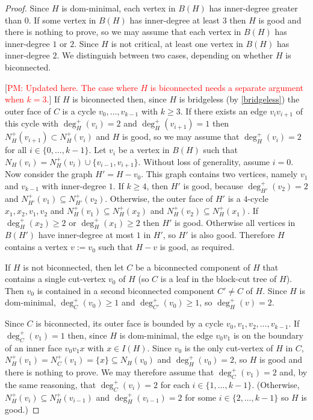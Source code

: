 \documentclass[12pt]{article}
\newcommand{\pat}[1]{[\textcolor{red}{PM: #1}]}
\begin{document}
\begin{proof}
  Since $H$ is dom-minimal, each vertex in $B(H)$ has inner-degree greater than $0$.  If some vertex in $B(H)$ has inner-degree at least $3$ then $H$ is good and there is nothing to prove, so we may assume that each vertex in $B(H)$ has inner-degree $1$ or $2$.  Since $H$ is not critical, at least one vertex in $B(H)$ has inner-degree $2$.  We distinguish between two cases, depending on whether $H$ is biconnected.

  \pat{Updated here. The case where $H$ is biconnected needs a separate argument when $k=3$.}
  If $H$ is biconnected then, since $H$ is bridgeless (by \cref{bridgeless}) the outer face of $C$ is a cycle $v_0,\ldots,v_{k-1}$ with $k\ge 3$. If there exists an edge $v_iv_{i+1}$ of this cycle with $\deg^+_H(v_i)=2$ and $\deg^+_H(v_{i+1})=1$ then $N_H^+(v_{i+1})\subset N_H^+(v_i)$ and $H$ is good, so we may assume that $\deg^+_H(v_i)=2$ for all $i\in\{0,\ldots,k-1\}$.
  Let $v_i$ be a vertex in $B(H)$ such that $N_H(v_i)=N_H^+(v_i)\cup\{v_{i-1},v_{i+1}\}$.  Without loss of generality, assume $i=0$. Now consider the graph $H'=H-v_0$.  This graph contains two vertices, namely $v_{1}$ and $v_{k-1}$ with inner-degree $1$.  If $k\ge 4$, then $H'$ is good, because $\deg_{H'}^+(v_2)=2$ and $N^+_{H'}(v_1)\subseteq N^+_{H'}(v_2)$.  Otherwise, the outer face of $H'$ is a $4$-cycle $x_1,x_2,v_1,v_2$ and $N_H^+(v_1)\subseteq N_H^+(x_2)$ and $N_H^+(v_2)\subseteq N_H^+(x_1)$.  If $\deg^+_H(x_2)\ge 2$ or $\deg^+_H(x_1)\ge 2$ then $H'$ is good.  Otherwise all vertices in $B(H')$ have inner-degree at most $1$ in $H'$, so $H'$ is also good. Therefore $H$ contains a vertex $v:=v_0$ such that $H-v$ is good, as required.



  If $H$ is not biconnected, then let $C$ be a biconnected component of $H$ that contains a single cut-vertex $v_0$ of $H$ (so $C$ is a leaf in the block-cut tree of $H$). Then $v_0$ is contained in a second biconnected component $C'\neq C$ of $H$. Since $H$ is dom-minimal, $\deg^+_{C}(v_0)\ge 1$ and $\deg^+_{C'}(v_0)\ge 1$, so $\deg^+_H(v)= 2$.

  Since $C$ is biconnected, its outer face is bounded by a cycle $v_0,v_1,v_2,\ldots,v_{k-1}$.  If $\deg^+_C(v_1)=1$ then, since $H$ is dom-minimal, the edge $v_0v_1$ is on the boundary of an inner face $v_0v_1x$ with $x\in I(H)$.  Since $v_0$ is the only cut-vertex of $H$ in $C$, $N^+_H(v_1)=N^+_C(v_1)=\{x\}\subseteq N_H(v_0)$ and $\deg^+_H(v_0)=2$, so $H$ is good and there is nothing to prove.  We may therefore  assume that $\deg^+_C(v_1)=2$ and,  by the same reasoning, that $\deg^+_C(v_i)=2$ for each $i\in\{1,\ldots,k-1\}$.  (Otherwise, $N^+_H(v_i)\subseteq N^+_H(v_{i-1})$ and $\deg^+_H(v_{i-1})=2$ for some $i\in\{2,\ldots,k-1\}$ so $H$ is good.)


\end{proof}
\end{document}
